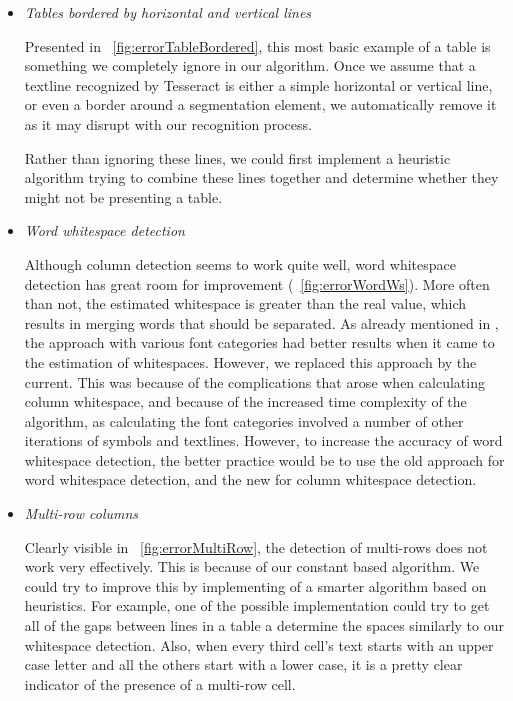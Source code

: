 \begin{itemize}
    \item \emph{Tables bordered by horizontal and vertical lines}
    
    Presented in ~\cref{fig:errorTableBordered}, this most basic example of a table is something we completely ignore in our algorithm. Once we assume that a textline recognized by Tesseract is either a simple horizontal or vertical line, or even a border around a segmentation element, we automatically remove it as it may disrupt with our recognition process.
    
    Rather than ignoring these lines, we could first implement a heuristic algorithm trying to combine these lines together and determine whether they might not be presenting a table.
    
    \item \emph{Word whitespace detection}

    Although column detection seems to work quite well, word whitespace detection has great room for improvement (~\cref{fig:errorWordWs}). More often than not, the estimated whitespace is greater than the real value, which results in merging words that should be separated. As already mentioned in , the approach with various font categories had better results when it came to the estimation of whitespaces. However, we replaced this approach by the current. This was because of the complications that arose when calculating column whitespace, and because of the increased time complexity of the algorithm, as calculating the font categories involved a number of other iterations of symbols and textlines. However, to increase the accuracy of word whitespace detection, the better practice would be to use the old approach for word whitespace detection, and the new for column whitespace detection. 
    
    \item \emph{Multi-row columns}
    
    Clearly visible in ~\cref{fig:errorMultiRow}, the detection of multi-rows does not work very effectively. This is because of our constant based algorithm. We could try to improve this by implementing of a smarter algorithm based on heuristics. For example, one of the possible implementation could try to get all of the gaps between lines in a table a determine the spaces similarly to our whitespace detection. Also, when every third cell's text starts with an upper case letter and all the others start with a lower case, it is a pretty clear indicator of the presence of a multi-row cell.
    

\end{itemize}
